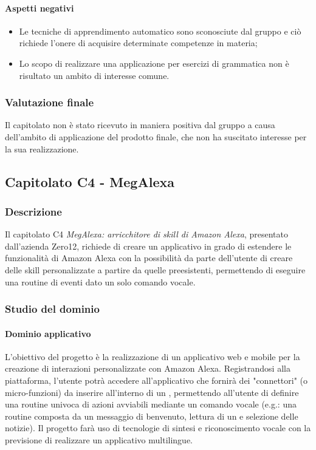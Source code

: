 	\paragraph{Aspetti negativi} 
	\begin{itemize}
		\item {Le tecniche di apprendimento automatico sono sconosciute dal gruppo e ciò richiede l'onere di acquisire determinate competenze in materia;}
		\item {Lo scopo di realizzare una applicazione per esercizi di grammatica non è risultato un ambito di interesse comune.}
	\end{itemize} 
	\subsubsection{Valutazione finale}
	Il capitolato non è stato ricevuto in maniera positiva dal gruppo a causa dell'ambito di applicazione del prodotto finale, che non ha suscitato interesse per la sua realizzazione.
	
\subsection{Capitolato C4 - MegAlexa}
\subsubsection{Descrizione}    
Il capitolato C4 \emph{MegAlexa: arricchitore di skill di Amazon Alexa}, presentato dall'azienda Zero12, richiede di creare un applicativo in grado di estendere le funzionalità di Amazon Alexa con la possibilità da parte dell'utente di creare delle skill personalizzate a partire da quelle preesistenti, permettendo di eseguire una routine di eventi dato un solo comando vocale.
\subsubsection{Studio del dominio}

\paragraph{Dominio applicativo} \Spazio
L'obiettivo del progetto è la realizzazione di un applicativo web e mobile per la creazione di interazioni personalizzate con Amazon Alexa. Registrandosi alla piattaforma, l'utente potrà accedere all'applicativo che fornirà dei "connettori" (o micro-funzioni) da inserire all'interno di un , permettendo all'utente di definire una routine univoca di azioni avviabili mediante un comando vocale (e.g.: una routine composta da un messaggio di benvenuto, lettura di un  e selezione delle notizie). Il progetto farà uso di tecnologie di sintesi e riconoscimento vocale con la previsione di realizzare un applicativo multilingue.
